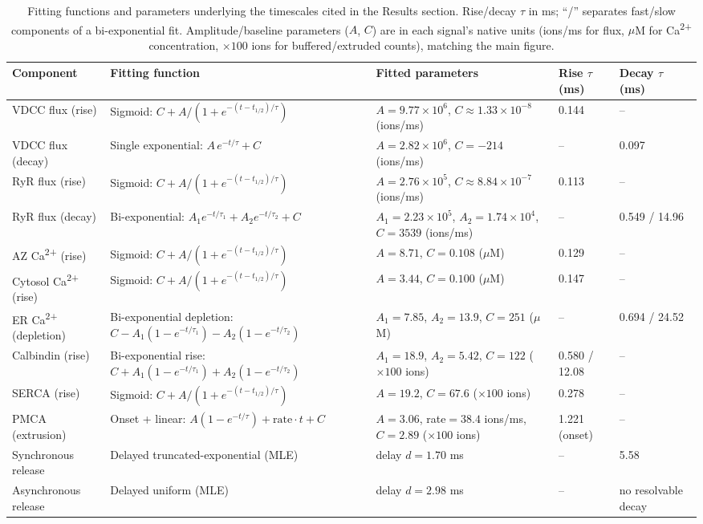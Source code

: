 \begin{table}[htbp]
\centering
\caption{Fitting functions and parameters underlying the timescales cited in the Results section. Rise/decay $\tau$ in ms; ``/'' separates fast/slow components of a bi-exponential fit. Amplitude/baseline parameters ($A$, $C$) are in each signal's native units (ions/ms for flux, $\mu$M for Ca\textsuperscript{2+} concentration, $\times100$ ions for buffered/extruded counts), matching the main figure.}
\label{tab:timescale_fits}
\small
\begin{tabular}{p{2.6cm} p{4.2cm} p{4.6cm} p{1.6cm} p{2.0cm}}
\hline
\textbf{Component} & \textbf{Fitting function} & \textbf{Fitted parameters} & \textbf{Rise $\tau$ (ms)} & \textbf{Decay $\tau$ (ms)} \\
\hline
VDCC flux (rise) & Sigmoid: $C + A/(1+e^{-(t-t_{1/2})/\tau})$ & $A=9.77\times10^{6}$, $C\approx 1.33\times10^{-8}$ (ions/ms) & 0.144 & -- \\
VDCC flux (decay) & Single exponential: $A\,e^{-t/\tau} + C$ & $A=2.82\times10^{6}$, $C=-214$ (ions/ms) & -- & 0.097 \\
RyR flux (rise) & Sigmoid: $C + A/(1+e^{-(t-t_{1/2})/\tau})$ & $A=2.76\times10^{5}$, $C\approx 8.84\times10^{-7}$ (ions/ms) & 0.113 & -- \\
RyR flux (decay) & Bi-exponential: $A_1 e^{-t/\tau_1} + A_2 e^{-t/\tau_2} + C$ & $A_1=2.23\times10^{5}$, $A_2=1.74\times10^{4}$, $C=3539$ (ions/ms) & -- & 0.549 / 14.96 \\
AZ Ca\textsuperscript{2+} (rise) & Sigmoid: $C + A/(1+e^{-(t-t_{1/2})/\tau})$ & $A=8.71$, $C=0.108$ ($\mu$M) & 0.129 & -- \\
Cytosol Ca\textsuperscript{2+} (rise) & Sigmoid: $C + A/(1+e^{-(t-t_{1/2})/\tau})$ & $A=3.44$, $C=0.100$ ($\mu$M) & 0.147 & -- \\
ER Ca\textsuperscript{2+} (depletion) & Bi-exponential depletion: $C - A_1(1-e^{-t/\tau_1}) - A_2(1-e^{-t/\tau_2})$ & $A_1=7.85$, $A_2=13.9$, $C=251$ ($\mu$M) & -- & 0.694 / 24.52 \\
Calbindin (rise) & Bi-exponential rise: $C + A_1(1-e^{-t/\tau_1}) + A_2(1-e^{-t/\tau_2})$ & $A_1=18.9$, $A_2=5.42$, $C=122$ ($\times100$ ions) & 0.580 / 12.08 & -- \\
SERCA (rise) & Sigmoid: $C + A/(1+e^{-(t-t_{1/2})/\tau})$ & $A=19.2$, $C=67.6$ ($\times100$ ions) & 0.278 & -- \\
PMCA (extrusion) & Onset + linear: $A(1-e^{-t/\tau}) + \mathrm{rate}\cdot t + C$ & $A=3.06$, rate$=38.4$ ions/ms, $C=2.89$ ($\times100$ ions) & 1.221 (onset) & -- \\
Synchronous release & Delayed truncated-exponential (MLE) & delay $d=1.70$ ms & -- & 5.58 \\
Asynchronous release & Delayed uniform (MLE) & delay $d=2.98$ ms & -- & no resolvable decay \\
\hline
\end{tabular}
\end{table}
